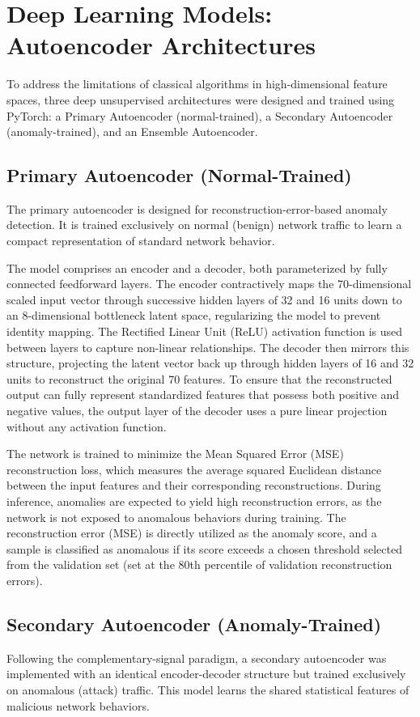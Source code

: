 \section{Deep Learning Models: Autoencoder Architectures}

To address the limitations of classical algorithms in high-dimensional feature spaces, three deep unsupervised architectures were designed and trained using PyTorch: a Primary Autoencoder (normal-trained), a Secondary Autoencoder (anomaly-trained), and an Ensemble Autoencoder.

\subsection{Primary Autoencoder (Normal-Trained)}
The primary autoencoder is designed for reconstruction-error-based anomaly detection. It is trained exclusively on normal (benign) network traffic to learn a compact representation of standard network behavior. 

The model comprises an encoder and a decoder, both parameterized by fully connected feedforward layers. The encoder contractively maps the 70-dimensional scaled input vector through successive hidden layers of 32 and 16 units down to an 8-dimensional bottleneck latent space, regularizing the model to prevent identity mapping. The Rectified Linear Unit (ReLU) activation function is used between layers to capture non-linear relationships. The decoder then mirrors this structure, projecting the latent vector back up through hidden layers of 16 and 32 units to reconstruct the original 70 features. To ensure that the reconstructed output can fully represent standardized features that possess both positive and negative values, the output layer of the decoder uses a pure linear projection without any activation function.

The network is trained to minimize the Mean Squared Error (MSE) reconstruction loss, which measures the average squared Euclidean distance between the input features and their corresponding reconstructions. During inference, anomalies are expected to yield high reconstruction errors, as the network is not exposed to anomalous behaviors during training. The reconstruction error (MSE) is directly utilized as the anomaly score, and a sample is classified as anomalous if its score exceeds a chosen threshold selected from the validation set (set at the 80th percentile of validation reconstruction errors).

\subsection{Secondary Autoencoder (Anomaly-Trained)}
Following the complementary-signal paradigm, a secondary autoencoder was implemented with an identical encoder-decoder structure but trained exclusively on anomalous (attack) traffic. This model learns the shared statistical features of malicious network behaviors. 

